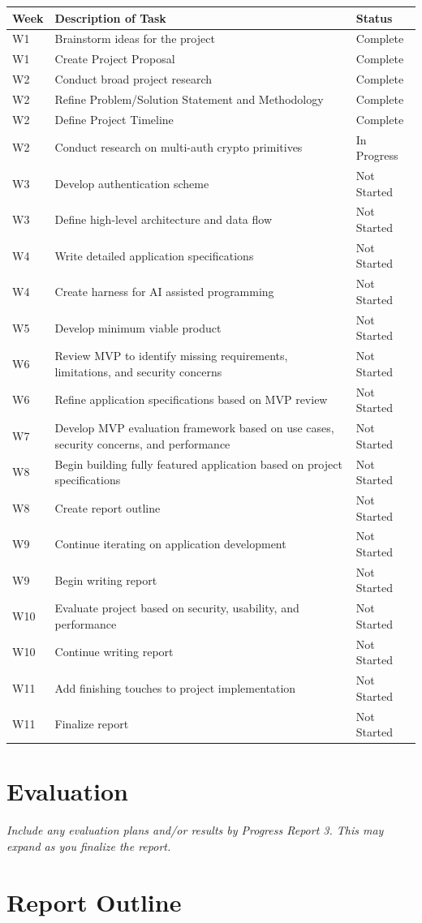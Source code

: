 \documentclass[12pt]{article}
\newcommand{\tlrow}[3]{#1 & #2 & #3 \\}
\newcommand{\instruction}[1]{{\small\itshape #1}}
\begin{document}
\vspace{0.5em}
\begin{tabularx}{\linewidth}{@{} l X l @{}}
  \toprule
  \textbf{Week} & \textbf{Description of Task} & \textbf{Status} \\
  \midrule
  \tlrow{W1}  {Brainstorm ideas for the project} {Complete}
  \tlrow{W1}  {Create Project Proposal} {Complete}
  \tlrow{W2}  {Conduct broad project research} {Complete}
  \tlrow{W2}  {Refine Problem/Solution Statement and Methodology} {Complete}
  \tlrow{W2}  {Define Project Timeline} {Complete}
  \tlrow{W2}  {Conduct research on multi-auth crypto primitives} {In Progress}
  \tlrow{W3}  {Develop authentication scheme} {Not Started}
  \tlrow{W3}  {Define high-level architecture and data flow} {Not Started}
  \tlrow{W4}  {Write detailed application specifications} {Not Started}
  \tlrow{W4}  {Create harness for AI assisted programming} {Not Started}
  \tlrow{W5}  {Develop minimum viable product} {Not Started}
  \tlrow{W6}  {Review MVP to identify missing requirements, limitations, and security concerns} {Not Started}
  \tlrow{W6}  {Refine application specifications based on MVP review} {Not Started}
  \tlrow{W7}  {Develop MVP evaluation framework based on use cases, security concerns, and performance} {Not Started}
  \tlrow{W8}  {Begin building fully featured application based on project specifications} {Not Started}
  \tlrow{W8}  {Create report outline} {Not Started}
  \tlrow{W9}  {Continue iterating on application development} {Not Started}
  \tlrow{W9}  {Begin writing report} {Not Started}
  \tlrow{W10} {Evaluate project based on security, usability, and performance} {Not Started}
  \tlrow{W10} {Continue writing report} {Not Started}
  \tlrow{W11} {Add finishing touches to project implementation} {Not Started}
  \tlrow{W11} {Finalize report} {Not Started}
  \bottomrule
\end{tabularx}

\section*{Evaluation}

\instruction{Include any evaluation plans and/or results by Progress Report 3. This may expand as you finalize the report.}

\section*{Report Outline}
\end{document}
